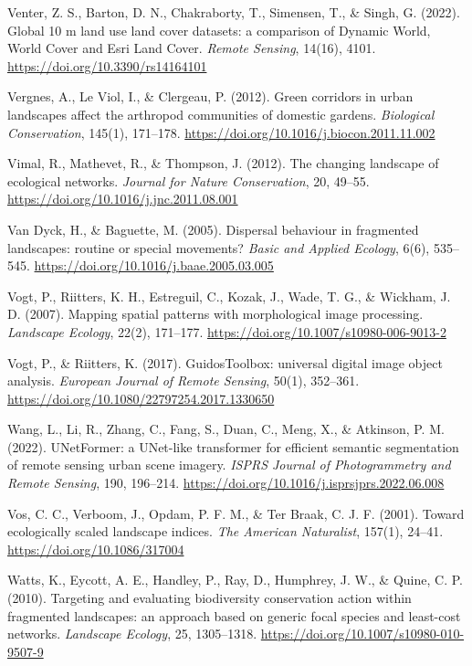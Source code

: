 \documentclass[a4paper,11pt]{report}
\begin{document}
Venter, Z. S., Barton, D. N., Chakraborty, T., Simensen, T., \& Singh, G. (2022). Global 10 m land use land cover datasets: a comparison of Dynamic World, World Cover and Esri Land Cover. \textit{Remote Sensing}, 14(16), 4101. \url{https://doi.org/10.3390/rs14164101}

Vergnes, A., Le Viol, I., \& Clergeau, P. (2012). Green corridors in urban landscapes affect the arthropod communities of domestic gardens. \textit{Biological Conservation}, 145(1), 171--178. \url{https://doi.org/10.1016/j.biocon.2011.11.002}

Vimal, R., Mathevet, R., \& Thompson, J. (2012). The changing landscape of ecological networks. \textit{Journal for Nature Conservation}, 20, 49--55. \url{https://doi.org/10.1016/j.jnc.2011.08.001}

Van Dyck, H., \& Baguette, M. (2005). Dispersal behaviour in fragmented landscapes: routine or special movements? \textit{Basic and Applied Ecology}, 6(6), 535--545. \url{https://doi.org/10.1016/j.baae.2005.03.005}

Vogt, P., Riitters, K. H., Estreguil, C., Kozak, J., Wade, T. G., \& Wickham, J. D. (2007). Mapping spatial patterns with morphological image processing. \textit{Landscape Ecology}, 22(2), 171--177. \url{https://doi.org/10.1007/s10980-006-9013-2}

Vogt, P., \& Riitters, K. (2017). GuidosToolbox: universal digital image object analysis. \textit{European Journal of Remote Sensing}, 50(1), 352--361. \url{https://doi.org/10.1080/22797254.2017.1330650}

Wang, L., Li, R., Zhang, C., Fang, S., Duan, C., Meng, X., \& Atkinson, P. M. (2022). UNetFormer: a UNet-like transformer for efficient semantic segmentation of remote sensing urban scene imagery. \textit{ISPRS Journal of Photogrammetry and Remote Sensing}, 190, 196--214. \url{https://doi.org/10.1016/j.isprsjprs.2022.06.008}

Vos, C. C., Verboom, J., Opdam, P. F. M., \& Ter Braak, C. J. F. (2001). Toward ecologically scaled landscape indices. \textit{The American Naturalist}, 157(1), 24--41. \url{https://doi.org/10.1086/317004}

Watts, K., Eycott, A. E., Handley, P., Ray, D., Humphrey, J. W., \& Quine, C. P. (2010). Targeting and evaluating biodiversity conservation action within fragmented landscapes: an approach based on generic focal species and least-cost networks. \textit{Landscape Ecology}, 25, 1305--1318. \url{https://doi.org/10.1007/s10980-010-9507-9}
\end{document}
